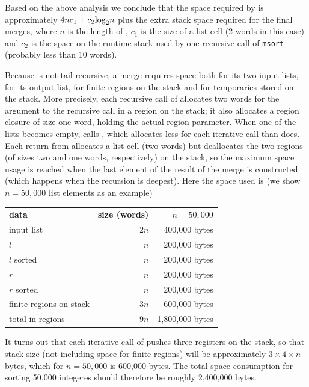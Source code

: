 \documentclass[12pt]{book}
\begin{document}
Based on the above analysis we conclude that the space required by
 is approximately $4nc_1+c_2{\rm log}_2n$ plus the extra
stack space required for the final merges, where $n$ is 
the length of , $c_1$ is the size of a list cell (2 words in this
case) and $c_2$ is the space on the runtime stack used by one recursive call
of {\tt msort} (probably less than 10 words). 

Because  is not tail-recursive, 
a merge requires space both for
its two input lists, for its output list, 
for finite regions on the stack and for
temporaries stored on the stack.  More precisely,
each recursive call of  allocates two words
for the argument to the recursive call in a region on the stack;
it also allocates a region closure of size one word, holding
the actual region parameter. When one of the lists becomes empty,
 calls , which allocates less for each 
iterative call than  does. Each return from 
 allocates a list cell (two words) but deallocates
the two regions (of sizes two and one words, respectively) 
on the stack, so
the maximum space usage is reached when the last element of the
result of the merge is constructed (which happens when the recursion 
is deepest). Here the space used is (we show $n = 50,000$ list elements
as an example)
\begin{center}
\begin{tabular}{lrr}
{\bf data} & {\bf size (words)} &$n=50,000$\\
input list& $2n$ & 400,000 bytes\\
$l$ & $n$ & 200,000 bytes\\
$l$ sorted & $n$ & 200,000 bytes\\
$r$ & $n$ & 200,000 bytes\\
$r$ sorted & $n$ & 200,000 bytes\\
finite regions on stack & $3n$ & 600,000 bytes\\ \hline
total in regions& $9n$ & 1,800,000 bytes
\end{tabular}
\end{center}

It turns out that each iterative call of  pushes
three registers on the stack, so that stack size (not including
space for finite regions) will be approximately $3\times 4\times n$
bytes, which for $n=50,000$ is 600,000 bytes. 
The total space consumption for sorting 50,000 integeres
should therefore be roughly 2,400,000 bytes.
\end{document}
